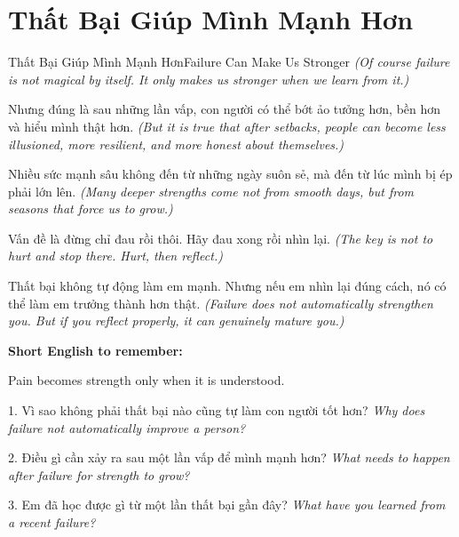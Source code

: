 \section{Thất Bại Giúp Mình Mạnh Hơn}
\begin{truyen}{Thất Bại Giúp Mình Mạnh Hơn}{Failure Can Make Us Stronger}
\textit{(Of course failure is not magical by itself. It only makes us stronger when we learn from it.)}

Nhưng đúng là sau những lần vấp, con người có thể bớt ảo tưởng hơn, bền hơn và hiểu mình thật hơn.
\textit{(But it is true that after setbacks, people can become less illusioned, more resilient, and more honest about themselves.)}

Nhiều sức mạnh sâu không đến từ những ngày suôn sẻ, mà đến từ lúc mình bị ép phải lớn lên.
\textit{(Many deeper strengths come not from smooth days, but from seasons that force us to grow.)}

Vấn đề là đừng chỉ đau rồi thôi. Hãy đau xong rồi nhìn lại.
\textit{(The key is not to hurt and stop there. Hurt, then reflect.)}
\end{truyen}

\begin{baihoc}
Thất bại không tự động làm em mạnh. Nhưng nếu em nhìn lại đúng cách, nó có thể làm em trưởng thành hơn thật.
\textit{(Failure does not automatically strengthen you. But if you reflect properly, it can genuinely mature you.)}
\end{baihoc}

\begin{ghinhoanh}
\textbf{Short English to remember:}

Pain becomes strength only when it is understood.

\end{ghinhoanh}

\begin{tuhocnhanh}
1. Vì sao không phải thất bại nào cũng tự làm con người tốt hơn? \textit{Why does failure not automatically improve a person?}

2. Điều gì cần xảy ra sau một lần vấp để mình mạnh hơn? \textit{What needs to happen after failure for strength to grow?}

3. Em đã học được gì từ một lần thất bại gần đây? \textit{What have you learned from a recent failure?}
\end{tuhocnhanh}
\ngancach

